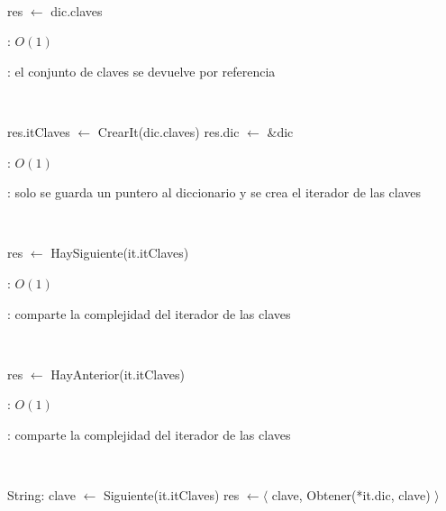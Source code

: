 \begin{Algoritmos}
	~

	\begin{algorithm}[H]
		\NoCaptionOfAlgo
		\caption{}
		res $\leftarrow$ dic.claves
	\end{algorithm}

	\complejidad: $O(1)$

	\justifcomp: el conjunto de claves se devuelve por referencia

	~


	\begin{algorithm}[H]
		\NoCaptionOfAlgo
		\caption{}
		res.itClaves $\leftarrow$ CrearIt(dic.claves)
		res.dic $\leftarrow$ \&dic
	\end{algorithm}

	\complejidad: $O(1)$

	\justifcomp: solo se guarda un puntero al diccionario y se crea el iterador de las claves

	~

	\begin{algorithm}[H]
		\NoCaptionOfAlgo
		\caption{}
		res $\leftarrow$ HaySiguiente(it.itClaves)
	\end{algorithm}

	\complejidad: $O(1)$

	\justifcomp: comparte la complejidad del iterador de las claves

	~

	\begin{algorithm}[H]
		\NoCaptionOfAlgo
		\caption{}
		res $\leftarrow$ HayAnterior(it.itClaves)
	\end{algorithm}

	\complejidad: $O(1)$

	\justifcomp: comparte la complejidad del iterador de las claves

	~

	\begin{algorithm}[H]
		\NoCaptionOfAlgo
		\caption{}
		String: clave $\leftarrow$ Siguiente(it.itClaves)
		res $\leftarrow \langle$ clave, Obtener(*it.dic, clave) $\rangle$
	\end{algorithm}


\end{Algoritmos}
